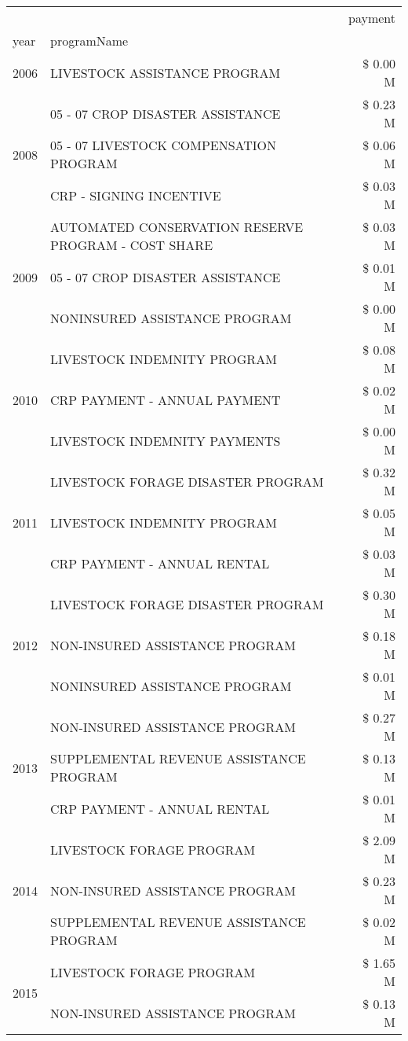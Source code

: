 \begin{tabular}{llr}
\toprule
 &  & payment \\
year & programName &  \\
\midrule
2006 & LIVESTOCK ASSISTANCE PROGRAM & \$ 0.00 M \\
\cline{1-3}
\multirow[t]{3}{*}{2008} & 05 - 07 CROP DISASTER ASSISTANCE & \$ 0.23 M \\
 & 05 - 07 LIVESTOCK COMPENSATION PROGRAM & \$ 0.06 M \\
 & CRP - SIGNING INCENTIVE & \$ 0.03 M \\
\cline{1-3}
\multirow[t]{3}{*}{2009} & AUTOMATED CONSERVATION RESERVE PROGRAM - COST SHARE & \$ 0.03 M \\
 & 05 - 07 CROP DISASTER ASSISTANCE & \$ 0.01 M \\
 & NONINSURED ASSISTANCE PROGRAM & \$ 0.00 M \\
\cline{1-3}
\multirow[t]{3}{*}{2010} & LIVESTOCK INDEMNITY PROGRAM & \$ 0.08 M \\
 & CRP PAYMENT - ANNUAL PAYMENT & \$ 0.02 M \\
 & LIVESTOCK INDEMNITY PAYMENTS & \$ 0.00 M \\
\cline{1-3}
\multirow[t]{3}{*}{2011} & LIVESTOCK FORAGE DISASTER PROGRAM & \$ 0.32 M \\
 & LIVESTOCK INDEMNITY PROGRAM & \$ 0.05 M \\
 & CRP PAYMENT - ANNUAL RENTAL & \$ 0.03 M \\
\cline{1-3}
\multirow[t]{3}{*}{2012} & LIVESTOCK FORAGE DISASTER PROGRAM & \$ 0.30 M \\
 & NON-INSURED ASSISTANCE PROGRAM & \$ 0.18 M \\
 & NONINSURED ASSISTANCE PROGRAM & \$ 0.01 M \\
\cline{1-3}
\multirow[t]{3}{*}{2013} & NON-INSURED ASSISTANCE PROGRAM & \$ 0.27 M \\
 & SUPPLEMENTAL REVENUE ASSISTANCE PROGRAM & \$ 0.13 M \\
 & CRP PAYMENT - ANNUAL RENTAL & \$ 0.01 M \\
\cline{1-3}
\multirow[t]{3}{*}{2014} & LIVESTOCK FORAGE PROGRAM & \$ 2.09 M \\
 & NON-INSURED ASSISTANCE PROGRAM & \$ 0.23 M \\
 & SUPPLEMENTAL REVENUE ASSISTANCE PROGRAM & \$ 0.02 M \\
\cline{1-3}
\multirow[t]{3}{*}{2015} & LIVESTOCK FORAGE PROGRAM & \$ 1.65 M \\
 & NON-INSURED ASSISTANCE PROGRAM & \$ 0.13 M \\

\end{tabular}
